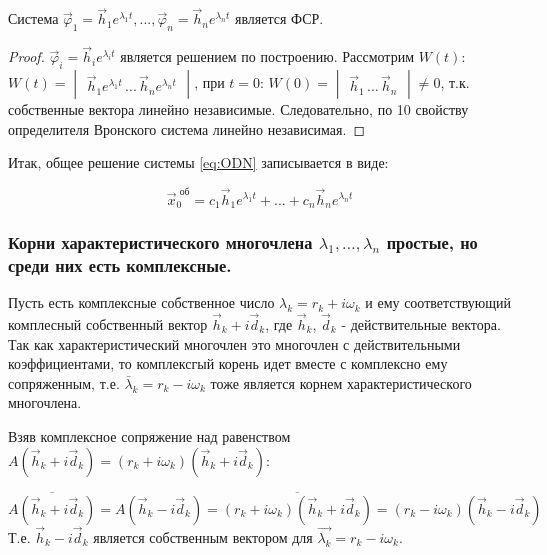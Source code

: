 \begin{lemma}
Система $\vec{\varphi}_1 = \vec{h}_1 e^{\lambda_1 t}, ..., \vec{\varphi}_n = \vec{h}_n e^{\lambda_n t}$ является ФСР. 
\end{lemma}

\begin{proof}
  $\vec{\varphi}_i = \vec{h}_i e^{\lambda_i t}$ является решением по построению. Рассмотрим $W(t)$: $W(t) = \begin{vmatrix*} \vec{h}_1 e^{\lambda_1 t} \,...\, \vec{h}_n e^{\lambda_n t}\end{vmatrix*}$, 
  при $t = 0$: $W(0) = \begin{vmatrix*} \vec{h}_1 \, ... \, \vec{h}_n \end{vmatrix*} \neq 0$, т.к. собственные вектора линейно независимые. 
  Следовательно, по 10 свойству определителя Вронского система линейно независимая.
\end{proof}

Итак, общее решение системы \eqref{eq:ODN} записывается в виде: 

\begin{equation*}
  \boxed{\vec{x}^{\text{ об}}_0 = c_1 \vec{h}_1 e^{\lambda_1 t} + ... + c_n \vec{h}_n e^{\lambda_n t}}
\end{equation*}

\subsubsection*{Корни характеристического многочлена $\lambda_1, \dots, \lambda_n$ простые, но среди них есть комплексные.}
Пусть есть комплексные собственное число $\lambda_k = r_k + i \omega_k$ и ему соответствующий комплесный собственный вектор $\vec{h}_k + i \vec{d}_k $, 
где $\vec{h}_k$, $\vec{d}_k$ - действительные вектора. Так как характеристический многочлен это многочлен с действительными коэффициентами, 
то комплексгый корень идет вместе с комплексно ему сопряженным, т.е. $\bar{\lambda}_k = r_k - i \omega_k$ тоже является корнем характеристического многочлена. 

Взяв комплексное сопряжение над равенством $A (\vec{h}_k + i \vec{d}_k) = (r_k + i \omega_k)(\vec{h}_k + i \vec{d}_k)$:

\[ \overline{A (\vec{h}_k + i \vec{d}_k)} = A (\vec{h}_k - i \vec{d}_k) = \overline{(r_k + i \omega_k)(\vec{h}_k + i \vec{d}_k)} = (r_k - i \omega_k)(\vec{h}_k - i \vec{d}_k) \]
Т.е. $\vec{h}_k - i \vec{d}_k$ является собственным вектором для $\vec{\lambda_k} = r_k - i \omega_k$.

